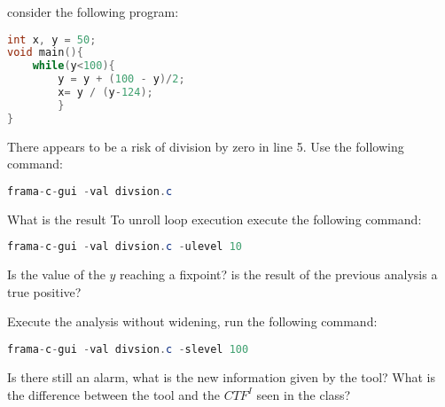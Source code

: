 \documentclass[language=en,sheet=1,prefix]{exercise}
\begin{document}
consider the following program:\\
\begin{lstlisting}[language=c]
int x, y = 50;
void main(){
	while(y<100){
		y = y + (100 - y)/2;
		x= y / (y-124);
		}
}
\end{lstlisting}
There appears to be a risk of division by zero in line 5. Use the following command:
\begin{lstlisting}[language=Java]
frama-c-gui -val divsion.c
\end{lstlisting}
What is the result
To unroll loop execution execute the following command:
\begin{lstlisting}[language=Java]
frama-c-gui -val divsion.c -ulevel 10
\end{lstlisting}
Is the value of the $y$ reaching a fixpoint? is the result of the previous analysis a true positive?

Execute the analysis without widening, run the following command:
\begin{lstlisting}[language=Java]
frama-c-gui -val divsion.c -slevel 100
\end{lstlisting}

Is there still an alarm, what is the new information given by the tool? What is the difference between the tool and the $CTF^I$ seen in the class?
\end{document}
